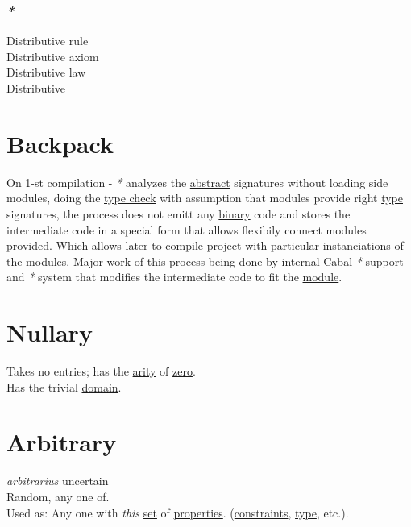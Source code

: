 \documentclass[a4paper,14pt,oneside]{book}
\begin{document}
\subsection{\emph{*}}
\label{sec:org5a82e35}

\label{org3862947}Distributive rule\\
\label{org037d44b}Distributive axiom\\
\label{orgc33448f}Distributive law\\
\label{orgdfa9db4}Distributive\\

\chapter{\label{orgab703d1}Backpack}
\label{sec:orgef0ce80}
On 1-st compilation - \emph{*} analyzes the \hyperref[org321fc4b]{abstract} signatures without loading side modules, doing the \hyperref[org0ab46ab]{type check} with assumption that modules provide right \hyperref[orgd6db20c]{type} signatures, the process does not emitt any \hyperref[orgd0575cd]{binary} code and stores the intermediate code in a special form that allows flexibily connect modules provided. Which allows later to compile project with particular instanciations of the modules. Major work of this process being done by internal Cabal \emph{*} support and \emph{*} system that modifies the intermediate code to fit the \hyperref[org5c9ad92]{module}.\\

\chapter{\label{org6c1bd06}Nullary}
\label{sec:org349b451}
Takes no entries; has the \hyperref[org7bee5cc]{arity} of \hyperref[org5935190]{zero}.\\
Has the trivial \hyperref[orgeb6ec49]{domain}.\\

\chapter{\label{orgec6a824}Arbitrary}
\label{sec:orgccaffa5}
\emph{arbitrarius} uncertain\\

Random, any one of.\\

Used as: Any one with \emph{this} \hyperref[orge119629]{set} of \hyperref[org1feb373]{properties}. (\hyperref[org621ee4c]{constraints}, \hyperref[orgd6db20c]{type}, etc.).\\
\end{document}
